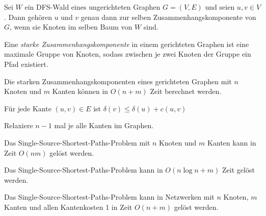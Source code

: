 \documentclass{cheat-sheet}
\begin{document}

\begin{satz}
  Sei $W$ ein DFS-Wald eines ungerichteten Graphen $G = (V, E)$ und seien $u, v \in V$. Dann gehören $u$ und $v$ genau dann zur selben Zusammenhangskomponente von $G$, wenn sie Knoten im selben Baum von $W$ sind.
\end{satz}

\begin{defn}
  Eine \emph{starke Zusammenhangskomponente} in einem gerichteten Graphen ist eine maximale Gruppe von Knoten, sodass zwischen je zwei Knoten der Gruppe ein Pfad existiert.
\end{defn}

\begin{satz}
  Die starken Zusammenhangskomponenten eines gerichteten Graphen mit $n$ Knoten und $m$ Kanten können in $O(n+m)$ Zeit berechnet werden.
\end{satz}




\begin{lem}
  Für jede Kante $(u, v) \in E$ ist $\delta(v) \leq \delta(u) + c(u, v)$
\end{lem}

\begin{alg}
  Relaxiere $n-1$ mal je alle Kanten im Graphen.
\end{alg}

\begin{satz}
  Das Single-Source-Shortest-Paths-Problem mit $n$ Knoten und $m$ Kanten kann in Zeit $O(nm)$ gelöst werden.
\end{satz}

\begin{satz}
  Das Single-Source-Shortest-Paths-Problem kann in $O(n \log n + m)$ Zeit gelöst werden.
\end{satz}

\begin{satz}
  Das Single-Source-Shortest-Paths-Problem kann in Netzwerken mit $n$ Knoten, $m$ Kanten und allen Kantenkosten 1 in Zeit $O(n+m)$ gelöst werden.
\end{satz}
\end{document}
